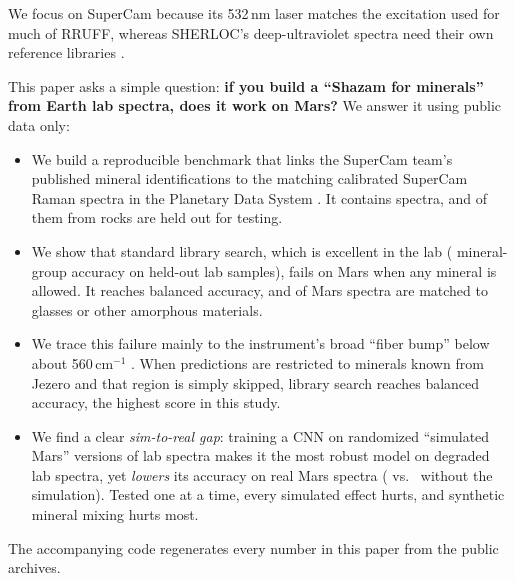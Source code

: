 We focus on SuperCam because its 532\,nm laser matches the excitation used for much of RRUFF, whereas SHERLOC's deep-ultraviolet spectra need their own reference libraries \citep{razzellhollis2021library}.

This paper asks a simple question: \textbf{if you build a ``Shazam for minerals'' from Earth lab spectra, does it work on Mars?} We answer it using public data only:
\begin{itemize}
\item We build a reproducible benchmark that links the SuperCam team's published mineral identifications to the matching calibrated SuperCam Raman spectra in the Planetary Data System \citep{wiens2021supercambundle}. It contains \nMarsMatched{} spectra, and \nMarsEval{} of them from \nMarsTargets{} rocks are held out for testing.
\item We show that standard library search, which is excellent in the lab (\labGrpCleanCosineOpen{} mineral-group accuracy on held-out lab samples), fails on Mars when any mineral is allowed. It reaches \balCosineOpen{} balanced accuracy, and \fracAmorphOpen{} of Mars spectra are matched to glasses or other amorphous materials.
\item We trace this failure mainly to the instrument's broad ``fiber bump'' below about 560\,cm$^{-1}$ \citep{clave2024unsupervised,lopezreyes2025supercam}. When predictions are restricted to minerals known from Jezero and that region is simply skipped, library search reaches \balCosineWindowMars{} balanced accuracy, the highest score in this study.
\item We find a clear \emph{sim-to-real gap}: training a CNN on randomized ``simulated Mars'' versions of lab spectra makes it the most robust model on degraded lab spectra, yet \emph{lowers} its accuracy on real Mars spectra (\balCnnMarsifiedMars{} vs.\ \balCnnCleanMars{} without the simulation). Tested one at a time, every simulated effect hurts, and synthetic mineral mixing hurts most.
\end{itemize}
The accompanying code regenerates every number in this paper from the public archives.
